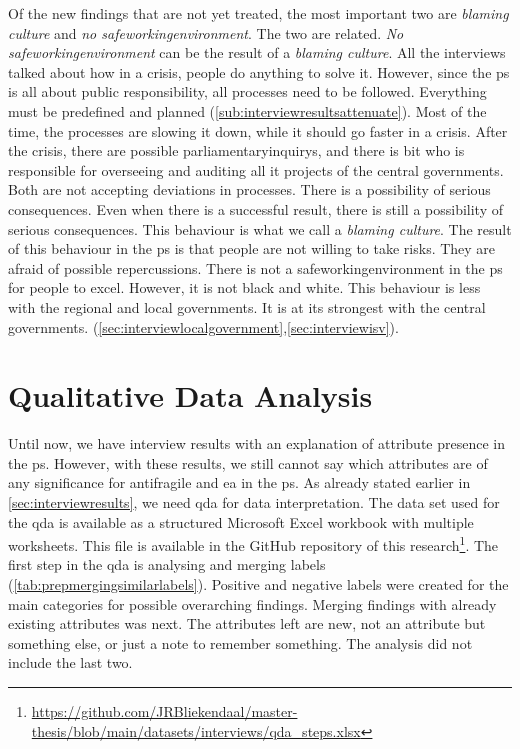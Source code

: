 Of the new findings that are not yet treated, the most important two are \textit{blaming culture} and \textit{no \gls{safeworkingenvironment}}. The two are related. \textit{No \gls{safeworkingenvironment}} can be the result of a \textit{blaming culture}. All the interviews talked about how in a crisis, people do anything to solve it. However, since the \gls{ps} is all about public responsibility, all processes need to be followed. Everything must be predefined and planned (\cref{sub:interviewresultsattenuate}). Most of the time, the processes are slowing it down, while it should go faster in a crisis. After the crisis, there are possible \glspl{parliamentaryinquiry}, and there is \acrshort{bit} who is responsible for overseeing and auditing all \acrshort{it} projects of the central governments. Both are not accepting deviations in processes. There is a possibility of serious consequences. Even when there is a successful result, there is still a possibility of serious consequences. This behaviour is what we call a \textit{blaming culture}. The result of this behaviour in the \gls{ps} is that people are not willing to take risks. They are afraid of possible repercussions. There is not a \gls{safeworkingenvironment} in the \gls{ps} for people to excel. However, it is not black and white. This behaviour is less with the regional and local governments. It is at its strongest with the central governments. (\cref{sec:interviewlocalgovernment},\cref{sec:interviewisv}).
\section{Qualitative Data Analysis}
\label{sec:dataprep}
 Until now, we have interview results with an explanation of attribute presence in the \gls{ps}. However, with these results, we still cannot say which attributes are of any significance for \gls{antifragile} and \acrshort{ea} in the \gls{ps}. As already stated earlier in \cref{sec:interviewresults}, we need \acrshort{qda} for data interpretation. The data set used for the \acrshort{qda} is available as a structured Microsoft Excel workbook with multiple worksheets. This file is available in the GitHub repository of this research\footnote{\url{https://github.com/JRBliekendaal/master-thesis/blob/main/datasets/interviews/qda_steps.xlsx}}.
 The first step in the \acrshort{qda} is analysing and merging labels (\cref{tab:prepmergingsimilarlabels}). Positive and negative labels were created for the main categories for possible overarching findings. Merging findings with already existing \glspl{attribute} was next. The \glspl{attribute} left are new, not an \gls{attribute} but something else, or just a note to remember something. The analysis did not include the last two. 
 

